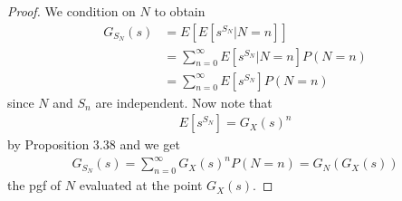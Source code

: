 \begin{proof}
  We condition on $N$ to obtain
  \begin{align*}
    G_{S_N}(s) &= E\left[ E\left[ s^{S_N} | N = n \right] \right] \\
    &= \sum_{n = 0}^\infty E[s^{S_N} | N = n] P(N = n) \\
    &= \sum_{n = 0}^\infty E[s^{S_N}] P(N = n)
  \end{align*}
  since $N$ and $S_n$ are independent. Now note that
  \begin{align*}
    E[s^{S_N}] = G_X(s)^n
  \end{align*}
  by Proposition 3.38 and we get
  \begin{align*}
    G_{S_N}(s) = \sum_{n = 0}^\infty G_X(s)^n P(N = n) = G_N(G_X(s))
  \end{align*}
  the pgf of $N$ evaluated at the point $G_X(s)$.
\end{proof}
%
%
%
%

